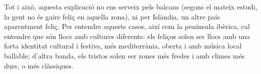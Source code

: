 Tot i això, aquesta explicació no ens serveix pels balcans (segons el mateix estudi, la gent no és gaire feliç en aquella zona), ni per Islàndia, un altre país aparentment feliç. Per entendre aquests casos, així com la península ibèrica, cal entendre que són llocs amb cultures diferents: els feliços solen ser llocs amb una forta identitat cultural i festiva, més mediterrània, oberta i amb música local ballable; d'altra banda, els tristos solen ser zones més fredes i amb climes més durs, o més clàssiques.


